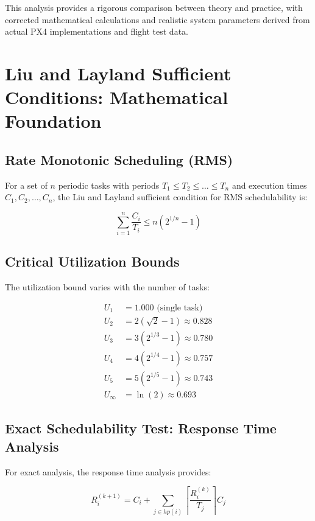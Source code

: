 \documentclass[12pt,a4paper]{article}
\begin{document}
This analysis provides a rigorous comparison between theory and practice, with corrected mathematical calculations and realistic system parameters derived from actual PX4 implementations and flight test data.

\section{Liu and Layland Sufficient Conditions: Mathematical Foundation}

\subsection{Rate Monotonic Scheduling (RMS)}

For a set of $n$ periodic tasks with periods $T_1 \leq T_2 \leq \ldots \leq T_n$ and execution times $C_1, C_2, \ldots, C_n$, the Liu and Layland sufficient condition for RMS schedulability is:

\begin{equation}
\sum_{i=1}^{n} \frac{C_i}{T_i} \leq n(2^{1/n} - 1)
\end{equation}

\subsection{Critical Utilization Bounds}

The utilization bound varies with the number of tasks:

\begin{align}
U_1 &= 1.000 \text{ (single task)} \\
U_2 &= 2(\sqrt{2} - 1) \approx 0.828 \\
U_3 &= 3(2^{1/3} - 1) \approx 0.780 \\
U_4 &= 4(2^{1/4} - 1) \approx 0.757 \\
U_5 &= 5(2^{1/5} - 1) \approx 0.743 \\
U_{\infty} &= \ln(2) \approx 0.693
\end{align}

\subsection{Exact Schedulability Test: Response Time Analysis}

For exact analysis, the response time analysis provides:

\begin{equation}
R_i^{(k+1)} = C_i + \sum_{j \in hp(i)} \left\lceil \frac{R_i^{(k)}}{T_j} \right\rceil C_j
\end{equation}
\end{document}
